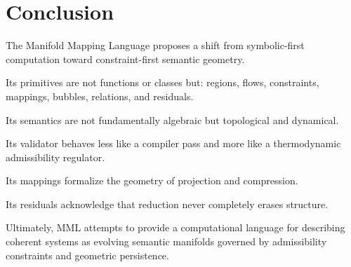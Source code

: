 \documentclass[11pt]{article}
\begin{document}
\section{Conclusion}

The Manifold Mapping Language proposes a shift from symbolic-first computation toward constraint-first semantic geometry.

Its primitives are not functions or classes but:
regions,
flows,
constraints,
mappings,
bubbles,
relations,
and residuals.

Its semantics are not fundamentally algebraic but topological and dynamical.

Its validator behaves less like a compiler pass and more like a thermodynamic admissibility regulator.

Its mappings formalize the geometry of projection and compression.

Its residuals acknowledge that reduction never completely erases structure.

Ultimately, MML attempts to provide a computational language for describing coherent systems as evolving semantic manifolds governed by admissibility constraints and geometric persistence.
\end{document}
